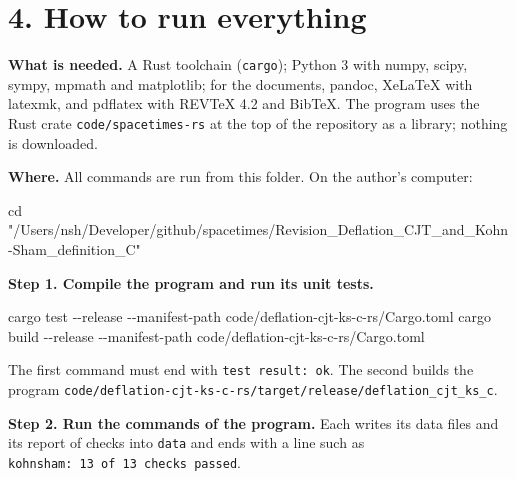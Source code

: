 \documentclass[
  10pt,
]{article}
\newenvironment{Shaded}{}{}
\newcommand{\AttributeTok}[1]{\textcolor[rgb]{0.49,0.56,0.16}{#1}}
\newcommand{\BuiltInTok}[1]{\textcolor[rgb]{0.00,0.50,0.00}{#1}}
\newcommand{\ControlFlowTok}[1]{\textcolor[rgb]{0.00,0.44,0.13}{\textbf{#1}}}
\newcommand{\DataTypeTok}[1]{\textcolor[rgb]{0.56,0.13,0.00}{#1}}
\newcommand{\ExtensionTok}[1]{#1}
\newcommand{\KeywordTok}[1]{\textcolor[rgb]{0.00,0.44,0.13}{\textbf{#1}}}
\newcommand{\NormalTok}[1]{#1}
\newcommand{\OperatorTok}[1]{\textcolor[rgb]{0.40,0.40,0.40}{#1}}
\newcommand{\StringTok}[1]{\textcolor[rgb]{0.25,0.44,0.63}{#1}}
\newcommand{\VariableTok}[1]{\textcolor[rgb]{0.10,0.09,0.49}{#1}}
\begin{document}
\hypertarget{how-to-run-everything}{%
\section{4. How to run everything}\label{how-to-run-everything}}

\textbf{What is needed.} A Rust toolchain (\texttt{cargo}); Python 3
with numpy, scipy, sympy, mpmath and matplotlib; for the documents,
pandoc, XeLaTeX with latexmk, and pdflatex with REVTeX 4.2 and BibTeX.
The program uses the Rust crate \texttt{code/spacetimes-rs} at the top
of the repository as a library; nothing is downloaded.

\textbf{Where.} All commands are run from this folder. On the author's
computer:

\begin{Shaded}
\begin{Highlighting}[]
\BuiltInTok{cd} \StringTok{"/Users/nsh/Developer/github/spacetimes/Revision\_Deflation\_CJT\_and\_Kohn{-}Sham\_definition\_C"}
\end{Highlighting}
\end{Shaded}

\textbf{Step 1. Compile the program and run its unit tests.}

\begin{Shaded}
\begin{Highlighting}[]
\ExtensionTok{cargo}\NormalTok{ test  }\AttributeTok{{-}{-}release} \AttributeTok{{-}{-}manifest{-}path}\NormalTok{ code/deflation{-}cjt{-}ks{-}c{-}rs/Cargo.toml}
\ExtensionTok{cargo}\NormalTok{ build }\AttributeTok{{-}{-}release} \AttributeTok{{-}{-}manifest{-}path}\NormalTok{ code/deflation{-}cjt{-}ks{-}c{-}rs/Cargo.toml}
\end{Highlighting}
\end{Shaded}

The first command must end with \texttt{test\ result:\ ok}. The second
builds the program
\texttt{code/deflation-cjt-ks-c-rs/target/release/deflation\_cjt\_ks\_c}.

\textbf{Step 2. Run the commands of the program.} Each writes its data
files and its report of checks into \texttt{data} and ends with a line
such as \texttt{kohnsham:\ 13\ of\ 13\ checks\ passed}.

\begin{Shaded}
\end{Shaded}
\end{document}
